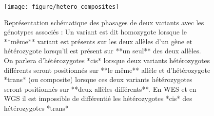\documentclass[12pt,twoside]{reedthesis}
\theoremstyle{definition}
\theoremstyle{definition}
\theoremstyle{remark}
\begin{document}
  \begin{figure}
  
  {\centering \texttt{[image: figure/hetero\_composites]} 
  
  }
  
  \caption[Représentation schématique des phasages de deux variants avec les génotypes associés]{Représentation schématique des phasages de deux variants avec les génotypes associés : Un variant est dit homozygote lorsque le **même** variant est présents sur les deux allèles d'un gène et hétérozygote lorsqu'il est présent sur **un seul** des deux allèles. On parlera d'hétérozygotes *cis* lorsque deux variants hétérozygotes différents seront positionnés sur **le même** allèle et d'hétérozygote *trans* (ou composite) lorsque ces deux variants hétérozygotes seront positionnés sur **deux allèles différents**. En WES et en WGS il est impossible de différentié les hétérozygotes *cis* des hétérozygotes *trans*}\label{fig:piccompositehet}
  \end{figure}
  
\end{document}
